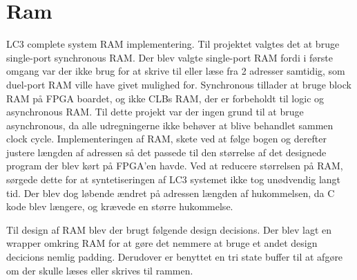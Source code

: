 \section{Ram}
 LC3 complete system RAM implementering.
Til projektet valgtes det at bruge single-port synchronous RAM. Der blev valgte single-port RAM fordi i første omgang var der ikke brug for at skrive til eller læse fra 2 adresser samtidig, som duel-port RAM ville have givet mulighed for. Synchronous tillader at bruge block RAM på FPGA boardet, og ikke CLBs RAM, der er forbeholdt til logic og asynchronous RAM. Til dette projekt var der ingen grund til at bruge asynchronous, da alle udregningerne ikke behøver at blive behandlet sammen clock cycle. Implementeringen af RAM, skete ved at følge bogen %
og derefter justere længden af adressen så det passede til den størrelse af det designede program der blev kørt på FPGA'en havde. Ved at reducere størrelsen på RAM, sørgede dette for at syntetiseringen af LC3 systemet ikke tog unødvendig langt tid. Der blev dog løbende ændret på adressen længden af hukommelsen, da C kode blev længere, og krævede en større hukommelse. %

Til design af RAM blev der brugt følgende design decisions. Der blev lagt en wrapper omkring RAM for at gøre det nemmere at bruge et andet design decicions nemlig padding. Derudover er benyttet en tri state buffer til at afgøre om der skulle læses eller skrives til rammen.
